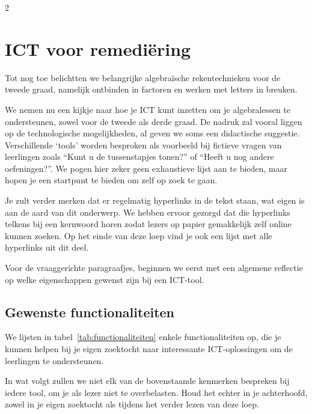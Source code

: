 \begin{multicols}{2}
	\section{ICT voor remediëring}
    Tot nog toe belichtten we belangrijke algebraïsche rekentechnieken voor de tweede graad, namelijk ontbinden in factoren en werken met letters in breuken.
    
    We nemen nu een kijkje naar hoe je ICT kunt inzetten om je algebralessen te ondersteunen, zowel voor de tweede als derde graad.
    De nadruk zal vooral liggen op de technologische mogelijkheden, al geven we soms een didactische suggestie.
    Verschillende `tools' worden besproken als voorbeeld bij fictieve vragen van leerlingen zoals ``Kunt u de tussenstapjes tonen?'' of ``Heeft u nog andere oefeningen?''.     
    We pogen hier zeker geen exhaustieve lijst aan te bieden, maar hopen je een startpunt te bieden om zelf op zoek te gaan.
    
    Je zult verder merken dat er regelmatig hyperlinks in de tekst staan, wat eigen is aan de aard van dit onderwerp.
    We hebben ervoor gezorgd dat die hyperlinks telkens bij een kernwoord horen zodat lezers op papier gemakkelijk zelf online kunnen zoeken.
    Op het einde van deze loep vind je ook een lijst met alle hyperlinks uit dit deel.

    Voor de vraaggerichte paragraafjes, beginnen we eerst met een algemene reflectie op welke eigenschappen gewenst zijn bij een ICT-tool.

    \subsection{Gewenste functionaliteiten} 


    
    We lijsten in tabel~\ref{tab:functionaliteiten} enkele functionaliteiten op, die je kunnen helpen bij je eigen zoektocht naar interessante ICT-oplossingen om de leerlingen te ondersteunen. 

        In wat volgt zullen we niet elk van de bovenstaande kenmerken bespreken bij iedere tool, om je als lezer niet te overbelasten.
    Houd het echter in je achterhoofd, zowel in je eigen zoektocht als tijdens het verder lezen van deze loep.

    \end{multicols}


